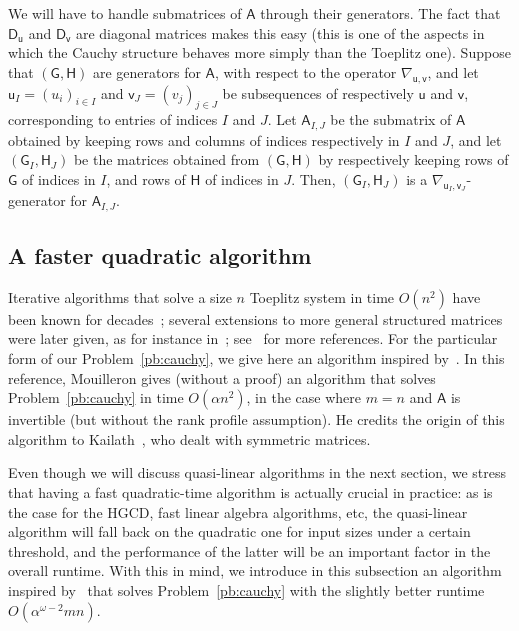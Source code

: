 \documentclass{sig-alternate}
\newcommand{\vu}{\ensuremath{\mathsf{u}}}
\newcommand{\vv}{\ensuremath{\mathsf{v}}}
\newcommand{\mA}{\ensuremath{\mathsf{A}}}
\newcommand{\mD}{\ensuremath{\mathsf{D}}}
\newcommand{\mG}{\ensuremath{\mathsf{G}}}
\newcommand{\mH}{\ensuremath{\mathsf{H}}}
\begin{document}
We will have to handle submatrices of $\mA$ through their
generators. The fact that $\mD_{\vu}$ and $\mD_{\vv}$ are diagonal matrices
makes this easy (this is one of the aspects in which the Cauchy
structure behaves more simply than the Toeplitz one).  Suppose that
$(\mG,\mH)$ are generators for $\mA$, with respect to the operator
$\nabla_{\vu,\vv}$, and let $\vu_I=(u_i)_{i \in I}$ and $\vv_J=(v_j)_{j \in
  J}$ be subsequences of respectively $\vu$ and $\vv$, corresponding to
entries of indices $I$ and $J$. Let $\mA_{I,J}$ be the submatrix of
$\mA$ obtained by keeping rows and columns of indices respectively in
$I$ and $J$, and let $(\mG_I,\mH_J)$ be the matrices obtained from
$(\mG,\mH)$ by respectively keeping rows of $\mG$ of indices in $I$,
and rows of $\mH$ of indices in $J$. Then, $(\mG_I,\mH_J)$ is a
$\nabla_{\vu_I,\vv_J}$-generator for $\mA_{I,J}$.


\subsection{A faster quadratic algorithm}

Iterative algorithms that solve a size $n$ Toeplitz system in time
$O(n^2)$ have been known for
decades~\cite{Levinson47,Durbin60,Trench64}; several extensions to
more general structured matrices were later given, as for instance
in~\cite{KaGoOl95}; see~\cite{Pan01} for more references. For the
particular form of our Problem~\ref{pb:cauchy}, we give here an
algorithm inspired by~\cite[Algorithme~4]{Mouilleron08}. In this
reference, Mouilleron gives (without a proof) an algorithm that solves
Problem~\ref{pb:cauchy} in time $O(\alpha n^2)$, in the case where
$m=n$ and $\mA$ is invertible (but without the rank profile
assumption). He credits the origin of this algorithm to
Kailath~\cite[\S1.10]{KaSa99}, who dealt with symmetric matrices.

Even though we will discuss quasi-linear algorithms in the next
section, we stress that having a fast quadratic-time algorithm is
actually crucial in practice: as is the case for the HGCD, fast linear
algebra algorithms, etc, the quasi-linear algorithm will fall back on
the quadratic one for input sizes under a certain threshold, and the
performance of the latter will be an important factor in the overall
runtime.
With this in mind, we introduce in this subsection an algorithm
inspired by~\cite{Mouilleron08} that solves Problem~\ref{pb:cauchy}
with the slightly better runtime $O(\alpha^{\omega-2} mn)$. 
\end{document}
